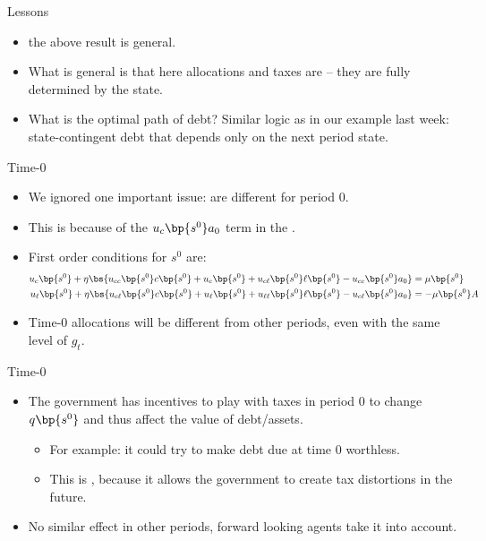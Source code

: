 \documentclass[11pt,xcolor={dvipsnames},hyperref={pdftex,pdfpagemode=UseNone,hidelinks,pdfdisplaydoctitle=true},usepdftitle=false]{beamer}
\begin{document}
    \begin{frame}{Lessons}
        \begin{itemize}
        \item {} the above result is  general.
        \item What is general is that here allocations and taxes are  -- they are fully determined by the  state.
        \item What is the optimal path of debt? Similar logic as in our example last week: state-contingent debt that depends only on the next period state.
        \end{itemize}
    \end{frame}   

    \begin{frame}{Time-0}
        \begin{itemize}
        \item We ignored one important issue:  are different for period 0. 
        \item This is because of the $u_c\bp{s^0} a_0$ term in the .
        \item First order conditions for $s^0$ are:    
        \footnotesize
         \begin{align*}
            u_c\bp{s^0}+ \eta \bs{ u_{cc} \bp{s^0} c\bp{s^0} + u_c \bp{s^0} + u_{c\ell} \bp{s^0} \ell\bp{s^0} - u_{cc} \bp{s^0} a_0 }  & =  \mu \bp{s^0} \\
            u_\ell\bp{s^0}+\eta \bs{ u_{c\ell} \bp{s^0} c\bp{s^0} + u_\ell \bp{s^0} + u_{\ell\ell} \bp{s^0} \ell\bp{s^0} - u_{c\ell} \bp{s^0} a_0  }  & =  - \mu \bp{s^0} A
          \end{align*}
          \normalsize
        \item Time-0 allocations will be different from other periods, even with the same level of $g_t$.
    \end{itemize}
    \end{frame}   

    \begin{frame}{Time-0}
        \begin{itemize}
        \item The government has incentives to play with taxes in period 0 to change $q\bp{s^0}$ and thus affect the value of debt/assets.
        \begin{itemize}
            \item For example: it could try to make debt due at time 0 worthless.
            \item This is , because it allows the government to create  tax distortions in the future.
        \end{itemize}
       \item No similar effect in other periods, forward looking agents take it into account.
    \end{itemize}
    \end{frame}   
\end{document}
